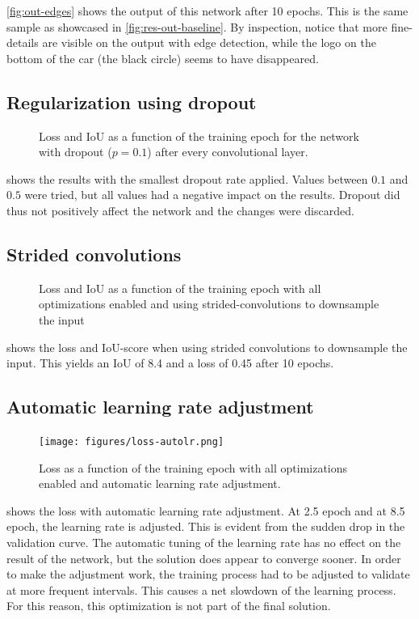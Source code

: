 \cref{fig:out-edges} shows the output of this network after 10 epochs. 
This is the same sample as showcased in \cref{fig:res-out-baseline}. 
By inspection, notice that more fine-details are visible on the output with edge detection, while the logo on the bottom of the car (the black circle) seems to have disappeared.

\subsection{Regularization using dropout}
\begin{figure}
	\centering
	\caption{Loss and IoU as a function of the training epoch for the network with dropout ($p=0.1$) after every convolutional layer.}
	\label{fig:res-dropout}
\end{figure}

 shows the results with the smallest dropout rate applied. Values between $0.1$ and $0.5$ were tried, but all values had a negative impact on the results. Dropout did thus not positively affect the network and the changes were discarded.

\subsection{Strided convolutions}
\begin{figure}
	\centering
	\caption{Loss and IoU as a function of the training epoch with all optimizations enabled and using strided-convolutions to downsample the input}
	\label{fig:res-strided}
\end{figure}
 shows the loss and IoU-score when using strided convolutions to downsample the input. This yields an IoU of 8.4 and a loss of 0.45 after 10 epochs. 

\subsection{Automatic learning rate adjustment}
\begin{figure}
	\centering
	\texttt{[image: figures/loss-autolr.png]}
	\caption{Loss as a function of the training epoch with all optimizations enabled and automatic learning rate adjustment.}
	\label{fig:res-autolr}
\end{figure}

 shows the loss with automatic learning rate adjustment. At 2.5 epoch and at 8.5 epoch, the learning rate is adjusted. 
This is evident from the sudden drop in the validation curve. The automatic tuning of the learning rate has no effect on the result of the network, but the solution does appear to converge sooner. 
In order to make the adjustment work, the training process had to be adjusted to validate at more frequent intervals. 
This causes a net slowdown of the learning process. For this reason, this optimization is not part of the final solution.

